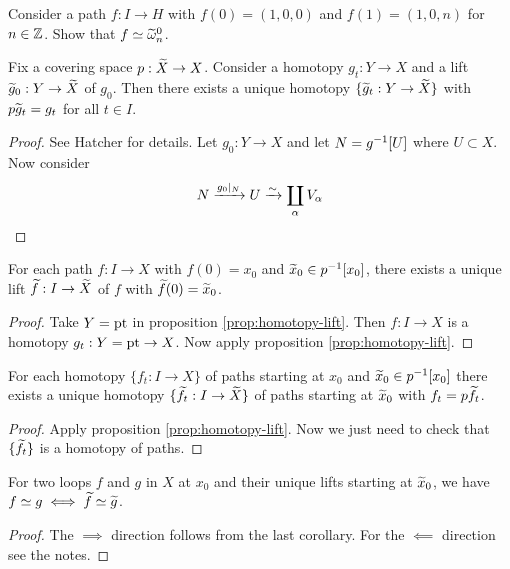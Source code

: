 \begin{exer}
	Consider a path $f: I \to H$ with $f(0)=(1,0,0)$ and $f(1)=(1,0,n)$ for $n \in \mathbb{Z}$.
	Show that $f \simeq \widetilde\omega_n^0$.
\end{exer}

\begin{prop}{\label{prop:homotopy-lift}}
	Fix a covering space $p: \widetilde X \to X$.
	Consider a homotopy $g_t: Y \to X$ and a lift $\widetilde g_0: Y \to \widetilde X$ of $g_0$.
	Then there exists a unique homotopy $\{\widetilde g_t: Y \to \widetilde X\}$ with $p\widetilde g_t=g_t$ for all $t \in I$.
\end{prop}

\begin{proof}
	See Hatcher for details.
	Let $g_0: Y \to X$ and let $N = g^{-1}[U]$ where $U \subset X$.
	Now consider
	\[N \xrightarrow{g_0|_N} U \xrightarrow{\sim} \coprod_\alpha V_\alpha \qedhere\]
\end{proof}

\begin{cor}
	For each path $f: I \to X$ with $f(0)=x_0$ and $\widetilde x_0 \in p^{-1}[x_0]$, there exists a unique lift $\widetilde f: I \to \widetilde X$ of $f$ with $\widetilde f(0) = \widetilde x_0$.
\end{cor}

\begin{proof}
	Take $Y = \operatorname{pt}$ in proposition \ref{prop:homotopy-lift}.
	Then $f: I \to X$ is a homotopy $g_t: Y = \operatorname{pt} \to X$.
	Now apply proposition \ref{prop:homotopy-lift}.
\end{proof}

\begin{cor}
	For each homotopy $\{f_t: I \to X\}$ of paths starting at $x_0$ and $\widetilde x_0 \in p^{-1}[x_0]$ there exists a unique homotopy $\{\widetilde f_t: I \to \widetilde X\}$ of paths starting at $\widetilde x_0$ with $f_t = p\widetilde f_t$.
\end{cor}

\begin{proof}
	Apply proposition \ref{prop:homotopy-lift}.
	Now we just need to check that $\{\widetilde f_t\}$ is a homotopy of paths.
\end{proof}

\begin{cor}
	For two loops $f$ and $g$ in $X$ at $x_0$ and their unique lifts starting at $\widetilde x_0$, we have $f \simeq g \iff \widetilde f \simeq \widetilde g$.
\end{cor}

\begin{proof}
	The $\implies$ direction follows from the last corollary.
	For the $\impliedby$ direction see the notes.
\end{proof}

